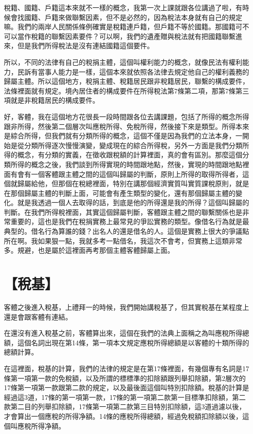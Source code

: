 \documentclass[]{ctexbook}
\begin{document}
稅籍、國籍、戶籍這本來就不一樣的概念，我第一次上課就跟各位講過了啦，有時候會找國籍、戶籍來做聯繫因素，但不是必然的，因為稅法本身就有自己的規定嘛。我們的兩岸人民關係條例確實是稅籍連戶籍，但戶籍不等於國籍。那國籍可不可以當作稅籍的聯繫因素要件？可以啊，我們的遺產贈與稅法就有把國籍聯繫進來，但是我們所得稅法是沒有連結國籍這個要件。

所以，不同的法律有自己的稅捐主體，這個叫權利能力的概念，就像民法有權利能力，民訴有當事人能力是一樣，這個本來就依照各法律去規定他自己的權利義務的歸屬主體。所以這個地方，稅捐主體、稅籍居民跟非稅籍居民，聯繫的構成要件，法條裡面就有規定。境內居住者的構成要件在所得稅法第7條第二項，那第7條第三項就是非稅籍居民的構成要件。

好，客體，我在這個地方花很長一段時間跟各位去講課題，包括了所得的概念所得跟非所得，然後第二個層次叫應稅所得、免稅所得，然後接下來是類型。所得本來是綜合所得，但我們就有分類所得的概念，這個不僅是因為我們的立法本身，一開始是從分類所得逐次慢慢演變，變成現在的綜合所得稅，另外一方面是我們分類所得的概念，有分類的實義，在徵收跟稅額的計算裡面，真的會有區別。那麼這個分類所得的概念之後，我們談到所得實現的時間跟地點，然後，實現的時間跟地點裡面有會有一個客體跟主體之間的這個叫歸屬的判斷，原則上所得的取得所得者，這個就歸屬給他，但那個在稅總裡面，特別在講那個經濟實質叫實質課稅原則，就是在那個歸屬主體的判斷上面，可能會有產生類型的變化，還有那個歸屬主體的變化。就是我透過一個人去取得的話，到底是他的所得還是我的所得？這個叫歸屬的判斷。在我們所得稅裡面，其實這個歸屬判斷，客體跟主體之間的聯繫關係也是非常重要的，這也是我們在稅捐實務上最常見的爭訟實務的類型。像借名行為就是最典型的。借名行為算誰的錢？出名人的還是借名的人。這個是實務上很大的爭議點所在啊。我如果狠一點，我就多考一點借名，我這次不會考，但實務上這類非常多。規避，也是屬於這裡面再考那個主體客體歸屬上面。

\hypertarget{ux7a05ux57fa-2}{%
\section{【稅基】}\label{ux7a05ux57fa-2}}

客體之後進入稅基，上禮拜一的時候，我們開始講稅基了，但其實稅基在某程度上還是會跟客體有連結。

在還沒有進入稅基之前，客體算出來，這個在我們的法典上面稱之為叫應稅所得總額，這個名詞出現在第14條，第一項本文規定應稅所得總額是以客體的十類所得的總額計算。

在這裡面，稅基的計算，我們的法律的規定是在第17條裡面，有幾個專有名詞是17條第一項第一款的免稅額，以及所謂的標標準的扣除額跟列舉扣除額，第2層次的17條第一項第一款跟第二款的規定，以及最後面這個叫特別扣除額。稅基的計算是經過這3道，17條的第一項第一款，17條的第一項第二款第一目標準扣除額，第二款第二目的列舉扣除額，17條第一項第二款第三目特別扣除額，這3道過濾以後，才會算出一個應稅的所得净額。14條的應稅所得總額，經過免稅額扣除額以後，這個叫應稅所得净額。
\end{document}
